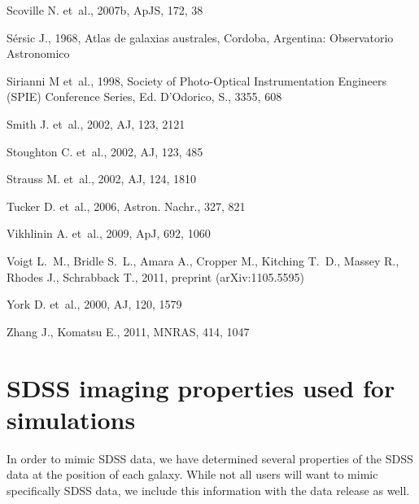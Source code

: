 \documentclass[twocolumn,useAMS,usenatbib]{mn2e}
\begin{document}
\begin{thebibliography}{}
 {Scoville} N. et~al., 2007b, ApJS, 172, 38

 {S\'ersic} J., 1968, {Atlas de galaxias australes}, Cordoba, Argentina: Observatorio Astronomico

{Sirianni} M et~al., 1998, {Society of Photo-Optical Instrumentation
  Engineers (SPIE) Conference Series}, Ed. D'Odorico, S., 3355, 608


 {Smith} J. et~al., 2002, AJ, 123, 2121

 {Stoughton} C. et~al., 2002, AJ, 123, 485

 {Strauss} M. et~al., 2002, AJ, 124, 1810

 {Tucker} D. et~al., 2006, Astron. Nachr., 327, 821

 {Vikhlinin} A. et~al., 2009, ApJ, 692, 1060

{Voigt} L.~M.,  {Bridle} S.~L.,  {Amara} A.,  {Cropper} M.,  
	{Kitching} T.~D.,  {Massey} R.,  {Rhodes} J.,  {Schrabback}
        T., 2011, preprint (arXiv:1105.5595)

 {York} D. et~al., 2000, AJ, 120, 1579

 {Zhang} J., {Komatsu} E., 2011, MNRAS, 414, 1047

\end{thebibliography}

\appendix

\section{SDSS imaging properties used for simulations}\label{S:sdssprops}

In order to mimic SDSS data, we have determined several
properties of the SDSS data at the position of each galaxy.  While not
all
users will want to mimic specifically SDSS data, we include this
information with the data release as well.
\end{document}
